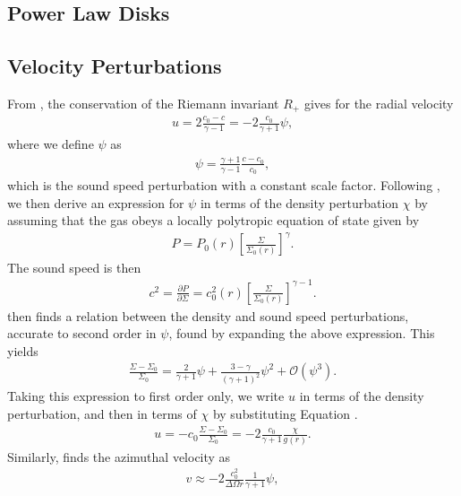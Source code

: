 \subsection{Power Law Disks}

\subsection{Velocity Perturbations}

From \citet{rafikov2002a}, the conservation of the Riemann invariant $R_+$ gives for the radial velocity
\begin{align}
    u = 2\frac{c_0-c}{\gamma - 1}=-2\frac{c_0}{\gamma + 1} \psi, \label{eq:u_rafikov}
\end{align}
where we define $\psi$ as
\begin{align}
    \psi = \frac{\gamma+1}{\gamma-1} \frac{c - c_0}{c_0},
\end{align}
which is the sound speed perturbation with a constant scale factor. Following \citet{rafikov2002a}, we then derive an expression for $\psi$ in terms of the density perturbation $\chi$ by assuming that the gas obeys a locally polytropic equation of state given by 
\begin{align}
    P = P_0(r) \left[ \frac{\Sigma}{\Sigma_0(r)} \right]^\gamma. \label{eq:poly_EOS}
\end{align}
The sound speed is then
\begin{align}
    c^2 = \frac{\partial P}{\partial \Sigma} = c_0^2(r) \left[ \frac{\Sigma}{\Sigma_0(r)} \right]^{\gamma-1}.
\end{align}
\citet{rafikov2002a} then finds a relation between the density and sound speed perturbations, accurate to second order in $\psi$, found by expanding the above expression. 
This yields
\begin{align}
    \frac{\Sigma - \Sigma_0}{\Sigma_0} = \frac{2}{\gamma + 1}\psi + \frac{3 - \gamma}{\left( \gamma + 1  \right)^2} \psi^2 + \mathcal{O}(\psi^3). \label{eq:psi_exp}
\end{align}
Taking this expression to first order only, we write $u$ in terms of the density perturbation, and then in terms of $\chi$ by substituting Equation \feqr. 
\begin{align}
    u = - c_0 \frac{\Sigma - \Sigma_0}{\Sigma_0} = -2 \frac{c_0}{\gamma + 1} \frac{\chi}{g(r)}. \label{eq:ap_rad_vel}
\end{align}
Similarly, \citet{rafikov2002a} finds the azimuthal velocity as
\begin{align}
    v \approx -2 \frac{c_0^2}{\Delta\Omega r} \frac{1}{\gamma + 1} \psi, \label{eq:v_rafikov}
\end{align}
